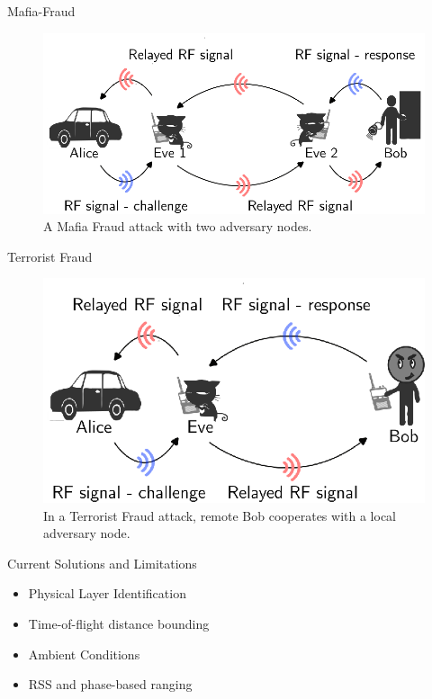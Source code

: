 \begin{frame}{Mafia-Fraud}
    \begin{figure}
    \hspace*{-2cm}
        \includegraphics[scale = 0.9]{slides/figures/mafia_fraud.eps}
        \caption{A Mafia Fraud attack with two adversary nodes.}
        \label{fig:enter-label}
    \end{figure}
\end{frame}

\begin{frame}{Terrorist Fraud}
    \begin{figure}
        \centering
        \includegraphics[scale = 0.9]{slides/figures/terrorist_fraud.eps}
        \caption{In a Terrorist Fraud attack, remote Bob cooperates with a local adversary node.}
        \label{fig:enter-label}
    \end{figure}
\end{frame}

\begin{frame}{Current Solutions and Limitations}
    \begin{itemize}
        \item Physical Layer Identification
        \item Time-of-flight distance bounding
        \item Ambient Conditions
        \item RSS and phase-based ranging
    \end{itemize}
    
\end{frame}



